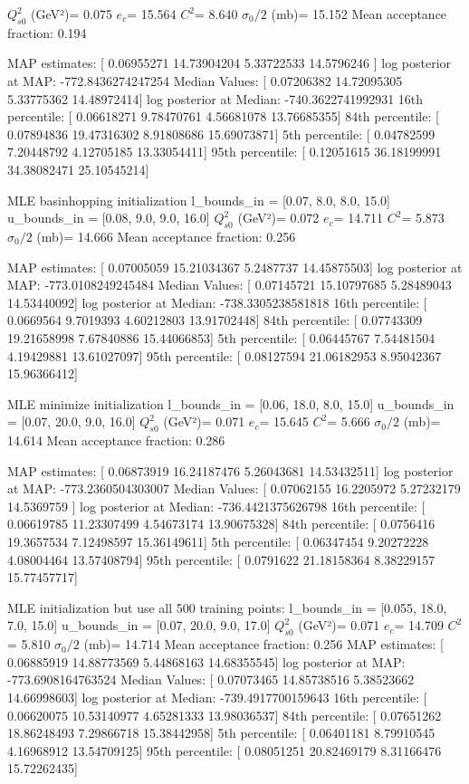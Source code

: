 \documentclass{article}
\begin{document}
$Q_{s0}^{2}$ (GeV²)= 0.075
$e_c$= 15.564
$C^{2}$= 8.640
$\sigma_0/2$ (mb)= 15.152
Mean acceptance fraction: 0.194

MAP estimates:  [ 0.06955271 14.73904204  5.33722533 14.5796246 ]
log posterior at MAP:  -772.8436274247254
Median Values:  [ 0.07206382 14.72095305  5.33775362 14.48972414]
log posterior at Median:  -740.3622741992931
16th percentile:  [ 0.06618271  9.78470761  4.56681078 13.76685355]
84th percentile:  [ 0.07894836 19.47316302  8.91808686 15.69073871]
5th percentile:  [ 0.04782599  7.20448792  4.12705185 13.33054411]
95th percentile:  [ 0.12051615 36.18199991 34.38082471 25.10545214]

MLE basinhopping initialization
l_bounds_in = [0.07, 8.0, 8.0, 15.0]
u_bounds_in = [0.08, 9.0, 9.0, 16.0]
$Q_{s0}^{2}$ (GeV²)= 0.072
$e_c$= 14.711
$C^{2}$= 5.873
$\sigma_0/2$ (mb)= 14.666
Mean acceptance fraction: 0.256

MAP estimates:  [ 0.07005059 15.21034367  5.2487737  14.45875503]
log posterior at MAP:  -773.0108249245484
Median Values:  [ 0.07145721 15.10797685  5.28489043 14.53440092]
log posterior at Median:  -738.3305238581818
16th percentile:  [ 0.0669564   9.7019393   4.60212803 13.91702448]
84th percentile:  [ 0.07743309 19.21658998  7.67840886 15.44066853]
5th percentile:  [ 0.06445767  7.54481504  4.19429881 13.61027097]
95th percentile:  [ 0.08127594 21.06182953  8.95042367 15.96366412]

MLE minimize initialization
l_bounds_in = [0.06, 18.0, 8.0, 15.0]
u_bounds_in = [0.07, 20.0, 9.0, 16.0]
$Q_{s0}^{2}$ (GeV²)= 0.071
$e_c$= 15.645
$C^{2}$= 5.666
$\sigma_0/2$ (mb)= 14.614
Mean acceptance fraction: 0.286


MAP estimates:  [ 0.06873919 16.24187476  5.26043681 14.53432511]
log posterior at MAP:  -773.2360504303007
Median Values:  [ 0.07062155 16.2205972   5.27232179 14.5369759 ]
log posterior at Median:  -736.4421375626798
16th percentile:  [ 0.06619785 11.23307499  4.54673174 13.90675328]
84th percentile:  [ 0.0756416  19.3657534   7.12498597 15.36149611]
5th percentile:  [ 0.06347454  9.20272228  4.08004464 13.57408794]
95th percentile:  [ 0.0791622  21.18158364  8.38229157 15.77457717]

MLE initialization but use all 500 training points: 
l_bounds_in = [0.055, 18.0, 7.0, 15.0]
u_bounds_in = [0.07, 20.0, 9.0, 17.0]
$Q_{s0}^{2}$ (GeV²)= 0.071
$e_c$= 14.709
$C^{2}$= 5.810
$\sigma_0/2$ (mb)= 14.714
Mean acceptance fraction: 0.256
MAP estimates:  [ 0.06885919 14.88773569  5.44868163 14.68355545]
log posterior at MAP:  -773.6908164763524
Median Values:  [ 0.07073465 14.85738516  5.38523662 14.66998603]
log posterior at Median:  -739.4917700159643
16th percentile:  [ 0.06620075 10.53140977  4.65281333 13.98036537]
84th percentile:  [ 0.07651262 18.86248493  7.29866718 15.38442958]
5th percentile:  [ 0.06401181  8.79910545  4.16968912 13.54709125]
95th percentile:  [ 0.08051251 20.82469179  8.31166476 15.72262435]
\end{document}
